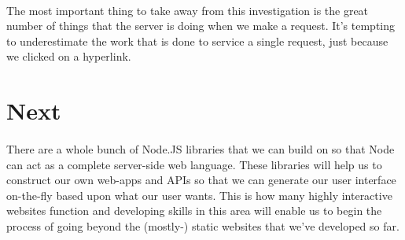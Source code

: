 \documentclass[10pt, a4paper, twosize]{article}
\begin{document}
\paragraph{} The most important thing to take away from this investigation is the great number of things that the server is doing when we make a request. It's tempting to underestimate the work that is done to service a single request, just because we clicked on a hyperlink.


\section{Next}
\paragraph{} There are a whole bunch of Node.JS libraries that we can build on so that Node can act as a complete server-side web language. These libraries will help us to construct our own web-apps and APIs so that we can generate our user interface on-the-fly based upon what our user wants. This is how many highly interactive websites function and developing skills in this area will enable us to begin the process of going beyond the (mostly-) static websites that we've developed so far. 
\end{document}
